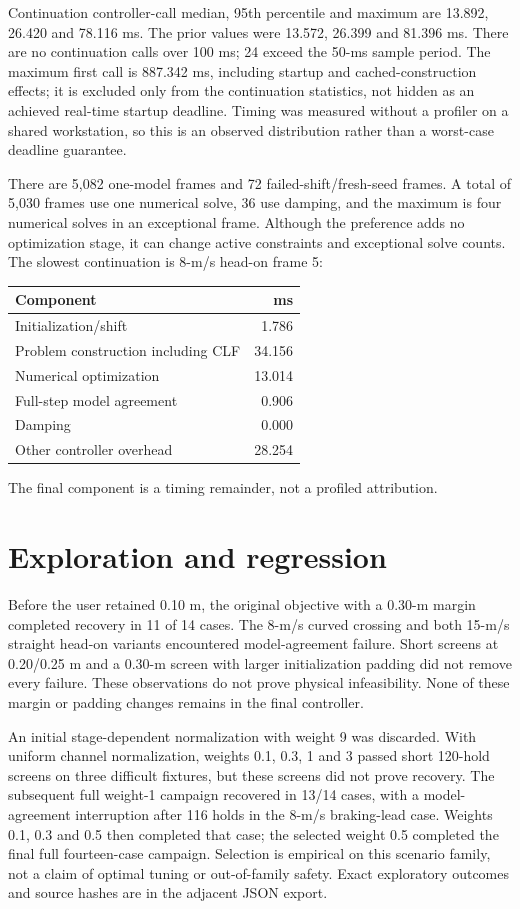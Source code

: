 \documentclass[10pt]{article}
\begin{document}
Continuation controller-call median, 95th percentile and maximum are
13.892, 26.420 and 78.116 ms. The prior values were 13.572, 26.399 and
81.396 ms. There are no continuation calls over 100 ms; 24 exceed the 50-ms
sample period. The maximum first call is 887.342 ms, including startup and
cached-construction effects; it is excluded only from the continuation
statistics, not hidden as an achieved real-time startup deadline. Timing was
measured without a profiler on a shared workstation, so this is an observed
distribution rather than a worst-case deadline guarantee.

There are 5,082 one-model frames and 72 failed-shift/fresh-seed frames. A total
of 5,030 frames use one numerical solve, 36 use damping, and the maximum is
four numerical solves in an exceptional frame. Although the preference adds
no optimization stage, it can change active constraints and exceptional solve
counts. The slowest continuation is 8-m/s head-on frame 5:
\begin{center}\begin{tabular}{lr}\toprule Component & ms\\\midrule
Initialization/shift & 1.786\\
Problem construction including CLF & 34.156\\
Numerical optimization & 13.014\\
Full-step model agreement & 0.906\\
Damping & 0.000\\
Other controller overhead & 28.254\\
\bottomrule\end{tabular}\end{center}
The final component is a timing remainder, not a profiled attribution.

\section{Exploration and regression}
Before the user retained 0.10 m, the original objective with a 0.30-m margin
completed recovery in 11 of 14 cases. The 8-m/s curved crossing and both
15-m/s straight head-on variants encountered model-agreement failure.
Short screens at 0.20/0.25 m and a 0.30-m screen with larger initialization
padding did not remove every failure. These observations do not prove physical
infeasibility. None of these margin or padding changes remains in the final
controller.

An initial stage-dependent normalization with weight 9 was discarded. With
uniform channel normalization, weights 0.1, 0.3, 1 and 3 passed short
120-hold screens on three difficult fixtures, but these screens did not prove
recovery. The subsequent full weight-1 campaign recovered in 13/14 cases,
with a model-agreement interruption after 116 holds in the 8-m/s braking-lead
case. Weights 0.1, 0.3 and 0.5 then completed that case; the selected weight
0.5 completed the final full fourteen-case campaign. Selection is empirical
on this scenario family, not a claim of optimal tuning or out-of-family safety.
Exact exploratory outcomes and source hashes are in the adjacent JSON export.
\end{document}
